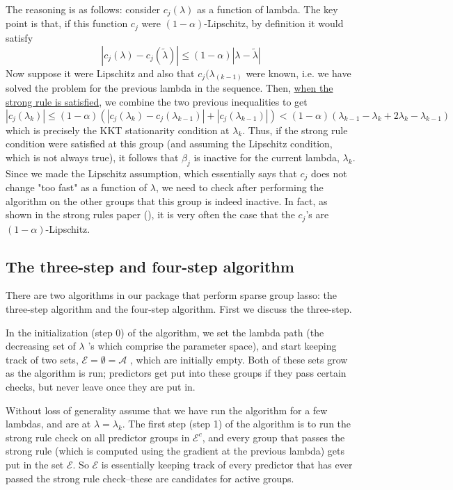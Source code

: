 \documentclass[titlepage]{article}
\begin{document}
The reasoning is as follows: consider $c_j(\lambda)$ as a function of lambda. The key point is that, if this function $c_j$ were $(1-\alpha)$-Lipschitz, by definition it would satisfy
\[
|c_j(\lambda) - c_j(\tilde{\lambda})|\leq (1-\alpha)|\lambda-\tilde{\lambda}|
\]
Now suppose it were Lipschitz and also that $c_j(\lambda_{(k-1)}$ were known, i.e. we have solved the problem for the previous lambda in the sequence. Then, \underline{when the strong rule is satisfied}, we combine the two previous inequalities to get
\[
|c_j(\lambda_k)|\leq (1-\alpha)(|c_j(\lambda_k) - c_j(\lambda_{k-1})|+|c_j(\lambda_{k-1})|)<(1-\alpha)(\lambda_{k-1}-\lambda_k+2\lambda_{k}-\lambda_{k-1})
\]
which is precisely the KKT stationarity condition at $\lambda_k$. Thus, if the strong rule condition were satisfied at this group (and assuming the Lipschitz condition, which is not always true), it follows that $\beta_j$ is inactive for the current lambda, $\lambda_k$. Since we made the Lipschitz assumption, which essentially says that $c_j$ does not change "too fast" as a function of $\lambda$, we need to check after performing the algorithm on the other groups that this group is indeed inactive. In fact, as shown in the strong rules paper (), it is very often the case that the $c_j$'s are $(1-\alpha)$-Lipschitz.

\subsection{The three-step and four-step algorithm}

There are two algorithms in our package that perform sparse group lasso: the three-step algorithm and the four-step algorithm. First we discuss the three-step.

In the initialization (step 0) of the algorithm, we set the lambda path (the decreasing set of $\lambda$ 's which comprise the parameter space), and start keeping track of two sets, $\mathcal{E} = \emptyset = \mathcal{A}$ , which are initially empty. Both of these sets grow as the algorithm is run; predictors get put into these groups if they pass certain checks, but never leave once they are put in.

Without loss of generality assume that we have run the algorithm for a few lambdas, and are at $\lambda = \lambda_{k}$. The first step (step 1) of the algorithm is to run the strong rule check on all predictor groups in $\mathcal{E}^c$, and every group that passes the strong rule (which is computed using the gradient at the previous lambda) gets put in the set $\mathcal{E}$. So $\mathcal{E}$ is essentially keeping track of every predictor that has ever passed the strong rule check--these are candidates for active groups.
\end{document}
